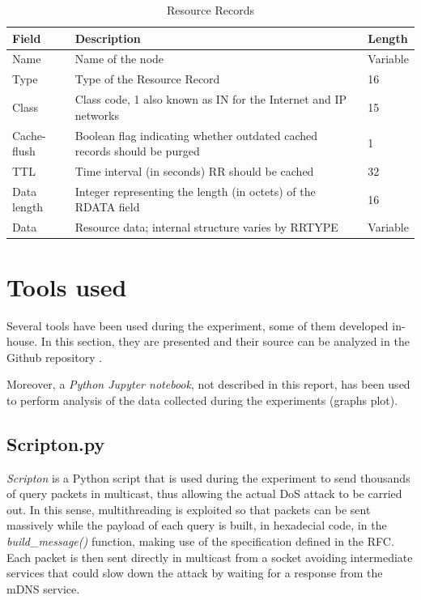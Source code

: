 \documentclass[fleqn, 11pt]{SelfArx} %
\begin{document}
\begin{table}[hbt]
	\centering
	\begin{tabular}{|C{2.0cm}|C{4.2cm}|C{1.25cm}|}
		\hline
		\textbf{Field} & \textbf{Description} & \textbf{Length} \\
		\hline
		\hline
		Name & Name of the node & Variable\\
		\hline
		Type & Type of the Resource Record & 16\\
		\hline
		Class & Class code, 1 also known as IN for the Internet and IP networks & 15\\
		\hline
		Cache-flush & Boolean flag indicating whether outdated cached records should be purged & 1\\
		\hline
		TTL & Time interval (in seconds) RR should be cached & 32\\
		\hline
		Data length & Integer representing the length (in octets) of the RDATA field & 16\\
		\hline
		Data & Resource data; internal structure varies by RRTYPE & Variable\\
		\hline
	\end{tabular}
	\caption{Resource Records}
	\label{table}
\end{table}


\section{Tools used}
Several tools have been used during the experiment, some of them developed in-house. In this section, they are presented and their source can be analyzed in the Github repository \cite{mDNS-security}. 

Moreover, a {\it{Python Jupyter notebook}}, not described in this report, has been used to perform analysis of the data collected during the experiments (graphs plot).

\subsection{Scripton.py}
\textit{Scripton} is a Python script that is used during the experiment to send thousands of query packets in multicast, thus allowing the actual DoS attack to be carried out.
In this sense, multithreading is exploited so that packets can be sent massively while the payload of each query is built, in hexadecial code, in the \textit{build\_message()} function, making use of the specification defined in the RFC\cite{rfc6762}. Each packet is then sent directly in multicast from a socket avoiding intermediate services that could slow down the attack by waiting for a response from the mDNS service.
\end{document}
